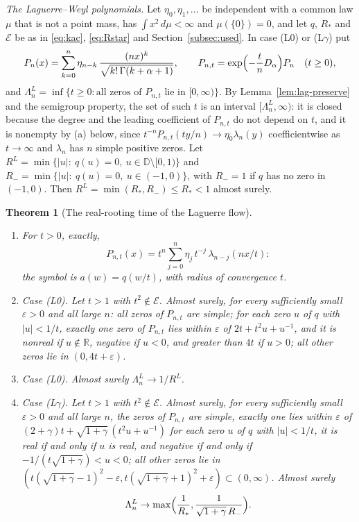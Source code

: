 \documentclass[11pt]{amsart}
\newtheorem{theorem}{Theorem}[section]
\theoremstyle{definition}
\theoremstyle{remark}
\numberwithin{equation}{section}
\newcommand{\R}{\mathbb{R}}
\newcommand{\D}{\mathbb{D}}
\newcommand{\eps}{\varepsilon}
\begin{document}
\emph{The Laguerre--Weyl polynomials.} Let $\eta_0,\eta_1,\dots$ be independent with a common law $\mu$ that is not a point mass, has $\int x^2\,d\mu<\infty$ and $\mu(\{0\})=0$, and let $q$, $R_*$ and $\mathcal E$ be as in \eqref{eq:kac}, \eqref{eq:Rstar} and Section~\ref{subsec:used}. In case (L0) or (L$\gamma$) put
\[
P_n(x)=\sum_{k=0}^{n}\eta_{n-k}\,\frac{(nx)^k}{\sqrt{k!\,\Gamma(k+\alpha+1)}},\qquad P_{n,t}=\exp\Bigl(-\frac tnD_\alpha\Bigr)P_n\quad(t\ge0),
\]
and $\Lambda^L_n=\inf\{t\ge0:\text{all zeros of }P_{n,t}\text{ lie in }[0,\infty)\}$. By Lemma~\ref{lem:lag-preserve} and the semigroup property, the set of such $t$ is an interval $[\Lambda^L_n,\infty)$: it is closed because the degree and the leading coefficient of $P_{n,t}$ do not depend on $t$, and it is nonempty by (a) below, since $t^{-n}P_{n,t}(ty/n)\to\eta_0\lambda_n(y)$ coefficientwise as $t\to\infty$ and $\lambda_n$ has $n$ simple positive zeros. Let $R^L=\min\{|u|:\ q(u)=0,\ u\in\D\setminus[0,1)\}$ and $R_-=\min\{|u|:\ q(u)=0,\ u\in(-1,0)\}$, with $R_-=1$ if $q$ has no zero in $(-1,0)$. Then $R^L=\min(R_*,R_-)\le R_*<1$ almost surely.

\begin{theorem}[The real-rooting time of the Laguerre flow]\label{thm:lag-rooting}
\begin{enumerate}
\item[(a)] For $t>0$, exactly,
\[
P_{n,t}(x)=t^n\sum_{j=0}^{n}\eta_j\,t^{-j}\,\lambda_{n-j}(nx/t):
\]
the symbol is $a(w)=q(w/t)$, with radius of convergence $t$.
\item[(b)] Case (L0). Let $t>1$ with $t^2\notin\mathcal E$. Almost surely, for every sufficiently small $\eps>0$ and all large $n$: all zeros of $P_{n,t}$ are simple; for each zero $u$ of $q$ with $|u|<1/t$, exactly one zero of $P_{n,t}$ lies within $\eps$ of $2t+t^2u+u^{-1}$, and it is nonreal if $u\notin\R$, negative if $u<0$, and greater than $4t$ if $u>0$; all other zeros lie in $(0,4t+\eps)$.
\item[(c)] Case (L0). Almost surely $\Lambda^L_n\to1/R^L$.
\item[(d)] Case (L$\gamma$). Let $t>1$ with $t^2\notin\mathcal E$. Almost surely, for every sufficiently small $\eps>0$ and all large $n$, the zeros of $P_{n,t}$ are simple, exactly one lies within $\eps$ of $(2+\gamma)t+\sqrt{1+\gamma}\,(t^2u+u^{-1})$ for each zero $u$ of $q$ with $|u|<1/t$, it is real if and only if $u$ is real, and negative if and only if $-1/(t\sqrt{1+\gamma})<u<0$; all other zeros lie in $(t(\sqrt{1+\gamma}-1)^2-\eps,t(\sqrt{1+\gamma}+1)^2+\eps)\subset(0,\infty)$. Almost surely
\[
\Lambda^L_n\to\max\Bigl(\frac1{R_*},\frac1{\sqrt{1+\gamma}\,R_-}\Bigr).
\]
\end{enumerate}
\end{theorem}
\end{document}
